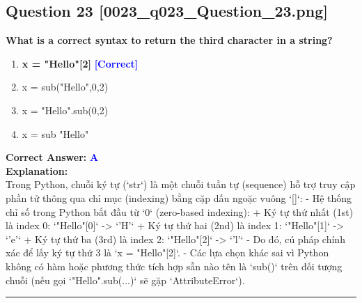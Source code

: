 \documentclass[11pt,a4paper]{article}
\begin{document}
\begin{minipage}{\textwidth}
\subsection*{Question 23 \quad \footnotesize{[0023_q023_Question_23.png]}}
\noindent \textbf{What is a correct syntax to return the third character in a string?}

\begin{enumerate}[label=\Alph*.]
    \item \textbf{x = "Hello"[2]} \hfill \textcolor{blue}{\textbf{[Correct]}}
    \item x = sub("Hello",0,2)
    \item x = "Hello".sub(0,2)
    \item x = sub "Hello"
\end{enumerate}

\noindent \textbf{Correct Answer:} \textcolor{blue}{\textbf{A}} \\[4pt]
\noindent \textbf{Explanation:}\\
Trong Python, chuỗi ký tự (`str`) là một chuỗi tuần tự (sequence) hỗ trợ truy cập phần tử thông qua chỉ mục (indexing) bằng cặp dấu ngoặc vuông `[]`:\newline
- Hệ thống chỉ số trong Python bắt đầu từ `0` (zero-based indexing):\newline
  + Ký tự thứ nhất (1st) là index 0: `"Hello"[0]` -> `'H'`\newline
  + Ký tự thứ hai (2nd) là index 1: `"Hello"[1]` -> `'e'`\newline
  + Ký tự thứ ba (3rd) là index 2: `"Hello"[2]` -> `'l'`\newline
- Do đó, cú pháp chính xác để lấy ký tự thứ 3 là `x = "Hello"[2]`.\newline
- Các lựa chọn khác sai vì Python không có hàm hoặc phương thức tích hợp sẵn nào tên là `sub()` trên đối tượng chuỗi (nếu gọi `"Hello".sub(...)` sẽ gặp `AttributeError`).
\end{minipage}
\vspace{0.8cm}
\hrule
\vspace{0.5cm}
\end{document}
